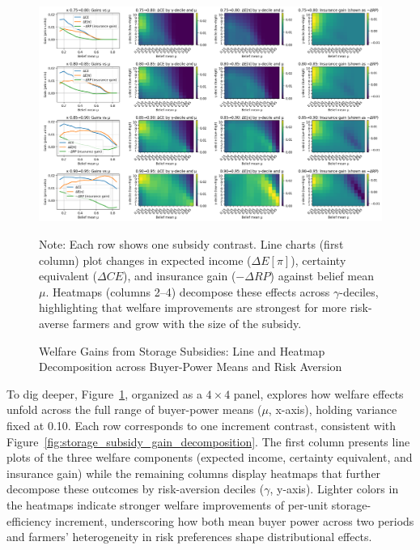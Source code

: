 \begin{figure}[ht]
    \centering
    \includegraphics[width=\linewidth]{model_figures/storage_subsidy_gain_heatmap.png}
    \caption{Welfare Gains from Storage Subsidies: Line and Heatmap Decomposition across Buyer-Power Means and Risk Aversion}
    \label{fig: storage_subsidy_gain_heatmap}
    \begin{tablenotes}
    \footnotesize
    \item Note: Each row shows one subsidy contrast. Line charts (first column) plot changes in expected income ($\Delta E[\pi]$), certainty equivalent ($\Delta CE$), and insurance gain ($-\Delta RP$) against belief mean $\mu$. Heatmaps (columns 2--4) decompose these effects across $\gamma$-deciles, highlighting that welfare improvements are strongest for more risk-averse farmers and grow with the size of the subsidy.
    \end{tablenotes}
\end{figure}

To dig deeper, Figure~\ref{fig: storage_subsidy_gain_heatmap}, organized as a $4 \times 4$ panel, explores how welfare effects unfold across the full range of buyer-power means ($\mu$, x-axis), holding variance fixed at 0.10. Each row corresponds to one increment contrast, consistent with Figure~\ref{fig:storage_subsidy_gain_decomposition}. The first column presents line plots of the three welfare components (expected income, certainty equivalent, and insurance gain) while the remaining columns display heatmaps that further decompose these outcomes by risk-aversion deciles ($\gamma$, y-axis). Lighter colors in the heatmaps indicate stronger welfare improvements of per-unit storage-efficiency increment, underscoring how both mean buyer power across two periods and farmers' heterogeneity in risk preferences shape distributional effects.

